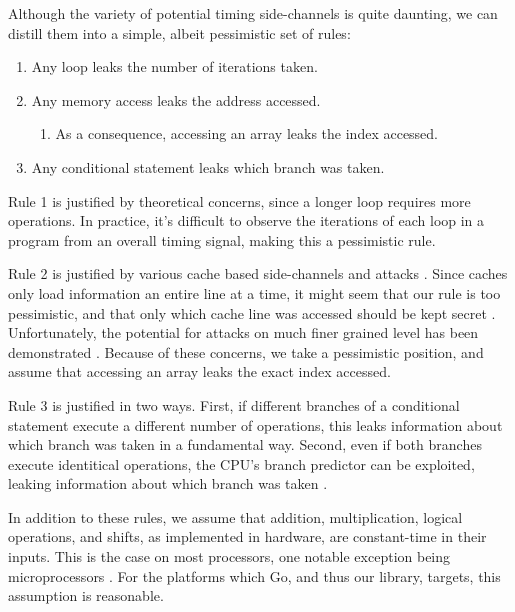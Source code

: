 \documentclass[11pt, a4paper]{article} %
\begin{document}
{Although the variety of potential timing side-channels is quite daunting,
we can distill them into a simple, albeit pessimistic set of rules:

\begin{enumerate}
  \item Any loop leaks the number of iterations taken.
  \item Any memory access leaks the address accessed.
  \begin{enumerate}
    \item As a consequence, accessing an array leaks the index accessed.
  \end{enumerate}
  \item Any conditional statement leaks which branch was taken.
\end{enumerate}

Rule 1 is justified by theoretical concerns, since a longer loop
requires more operations. In practice, it's difficult to observe
the iterations of each loop in a program from an overall timing signal,
making this a pessimistic rule.

Rule 2 is justified by various cache based side-channels and attacks
\cite{
  bernstein_cache-timing_2005,
  yarom_cachebleed_2017,
  cabrera_aldaya_cache-timing_2019}.
Since caches only load information an entire line at a time, it might
seem that our rule is too pessimistic, and that only which cache line
was accessed should be kept secret \cite{brickell_technologies_2011}.
Unfortunately, the potential for attacks on much finer grained
level has been demonstrated
\cite{
  bernstein_word_2013,
  osvik_cache_2006,
  yarom_cachebleed_2017}.
Because of these concerns, we take a pessimistic position, and assume
that accessing an array leaks the exact index accessed.


Rule 3 is justified in two ways. First, if different branches of a conditional
statement execute a different number of operations, this leaks information
about which branch was taken in a fundamental way. Second, even if both
branches execute identitical operations, the CPU's branch predictor
can be exploited, leaking information about which branch was taken
\cite{
  aciicmez_predicting_2006,
  aciicmez_power_2007,
  evtyushkin_jump_2016}.

In addition to these rules, we assume that addition, multiplication,
logical operations, and shifts, as implemented in hardware,
are constant-time in their inputs.
This is the case on most processors, one notable exception being
microprocessors
\cite{pornin_bearssl_nodate}. For the platforms which Go,
and thus our library, targets,
this assumption is reasonable.

}
\end{document}
